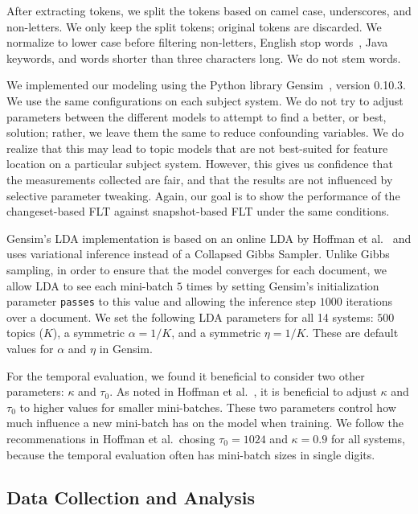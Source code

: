 After extracting tokens, we split the tokens based on camel case,
underscores, and non-letters.
We only keep the split tokens; original tokens are discarded.
We normalize to lower case before filtering non-letters, English stop words~\cite{StopWords}, Java keywords, and words shorter than three characters long.
We do not stem words.

We implemented our modeling using the Python library Gensim~\cite{Gensim},
version 0.10.3. We use the same configurations on each subject system.  We do
not try to adjust parameters between the different models to attempt to find
a better, or best, solution; rather, we leave them the same to reduce
confounding variables.  We do realize that this may lead to topic models that
are not best-suited for feature location on a particular subject system.
However, this gives us confidence that the measurements collected are fair, and
that the results are not influenced by selective parameter tweaking.  Again, our
goal is to show the performance of the changeset-based FLT against
snapshot-based FLT under the same conditions.

Gensim's LDA implementation is based on an online LDA by Hoffman et
al.~\cite{Hoffman-etal:2010} and uses variational inference instead of
a Collapsed Gibbs Sampler.  Unlike Gibbs sampling, in order to ensure that the
model converges for each document, we allow LDA to see each mini-batch $5$ times
by setting Gensim's initialization parameter \texttt{passes} to this value and
allowing the inference step $1000$ iterations over a document.  We set the
following LDA parameters for all 14 systems: $500$ topics ($K$), a symmetric
$\alpha=1/K$, and a symmetric $\eta=1/K$.  These are default values for
$\alpha$ and $\eta$ in Gensim.

For the temporal evaluation, we found it beneficial to consider two other
parameters: $\kappa$ and $\tau_0$.  As noted in Hoffman et
al.~\cite{Hoffman-etal:2010}, it is beneficial to adjust $\kappa$ and $\tau_0$
to higher values for smaller mini-batches.  These two parameters control how
much influence a new mini-batch has on the model when training.  We follow the
recommenations in Hoffman et al.\, chosing $\tau_0=1024$ and $\kappa=0.9$ for
all systems, because the temporal evaluation often has mini-batch sizes in
single digits.




\subsection{Data Collection and Analysis}
\label{sec:data}

